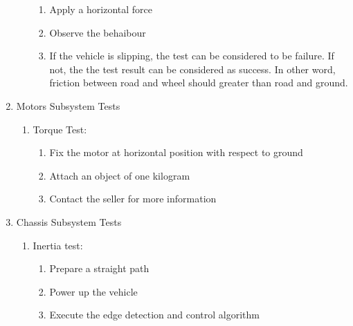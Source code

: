 \documentclass[a4paper,12pt]{article}
\begin{document}
\begin{enumerate}
\begin{enumerate}
\begin{enumerate}
\item Apply a horizontal force

\item Observe the behaibour 

\item If the vehicle is slipping, the test can be considered to be failure. If not, the the test result can be considered as success. In other word, friction between road and wheel should greater than road and ground. 


\end{enumerate}

\end{enumerate}


\item Motors Subsystem Tests


\begin{enumerate}

\item {Torque Test:} 

\begin{enumerate}

\item Fix the motor at horizontal position with respect to ground  

\item Attach an object of one kilogram  

\item Contact the seller for more information 

\end{enumerate}

\end{enumerate}










\item {Chassis Subsystem Tests}

\begin{enumerate}

\item Inertia test: 

\begin{enumerate}

\item Prepare a straight path

\item Power up the vehicle 

\item Execute the edge detection and control algorithm


\end{enumerate}
\end{enumerate}
\end{enumerate}
\end{document}
